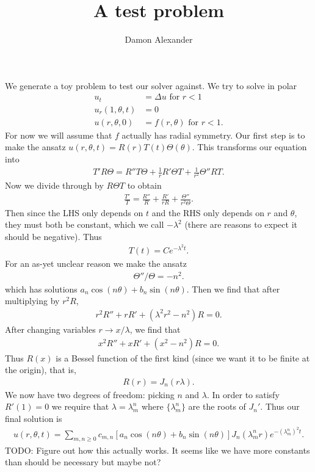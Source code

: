 \documentclass[a4paper,10pt]{article}
\title{A test problem}
\author{Damon Alexander}
\begin{document}
\maketitle

We generate a toy problem to test our solver against.  We try to solve in polar
\begin{align*}
	u_t &= \Delta u \mbox{ for } r < 1\\
	u_r(1,\theta,t) &= 0 \\ 
	u(r, \theta, 0) &= f(r, \theta) \mbox{ for } r < 1.
\end{align*}
For now we will assume that $f$ actually has radial symmetry.  Our first step is to make the ansatz $u(r, \theta,t) = R(r) T(t) \Theta(\theta)$.  This transforms our equation into 
\begin{align*}
	T' R \Theta =  R'' T \Theta + \frac{1}{r} R' \Theta T + \frac{1}{r^2} \Theta'' R T.
\end{align*}
Now we divide through by $R \Theta T$ to obtain
\begin{align*}
	\frac{T'}{T} = \frac{R''}{R} + \frac{R'}{r R} + \frac{ \Theta''}{r^2 \Theta}.
\end{align*}
Then since the LHS only depends on $t$ and the RHS only depends on $r$ and $\theta$, they must both be constant, which we call $- \lambda^2$ (there are reasons to expect it should be negative).  Thus
\begin{align*}
	T(t) = C e^{- \lambda^2 t}.
\end{align*}
For an as-yet unclear reason we make the ansatz
\begin{align*}
	\Theta'' / \Theta = -n^2.
\end{align*}
which has solutions $a_n \cos(n \theta) + b_n \sin(n\theta)$.  Then we find that after multiplying by $r^2 R$,
\begin{align*}
  r^2 R'' + r R' + \left( \lambda^2 r^2 - n^2\right) R = 0	.
\end{align*}
After changing variables $r \to x /\lambda$, we find that
\begin{align*}
  x^2 R'' + x R' + \left( x^2 - n^2\right) R = 0	.
\end{align*}
Thus $R(x)$ is a Bessel function of the first kind (since we want it to be finite at the origin), that is,
\begin{align*}
	R(r) = J_n(r \lambda).
\end{align*}
We now have two degrees of freedom: picking $n$ and $\lambda$.  In order to satisfy $R'(1) = 0$ we require that $\lambda = \lambda^n_m$ where $\{\lambda^n_m\}$ are the roots of $J_n'$.  Thus our final solution is
\begin{align*}
	u(r, \theta, t) = \sum_{m, n \ge 0} c_{m,n} [a_n \cos (n \theta) + b_n \sin(n \theta)] J_n( \lambda^n_m r) e^{-(\lambda^n_m )^2 t}.
\end{align*}
TODO: Figure out how this actually works.  It seems like we have more constants than should be necessary but maybe not?
\end{document}
